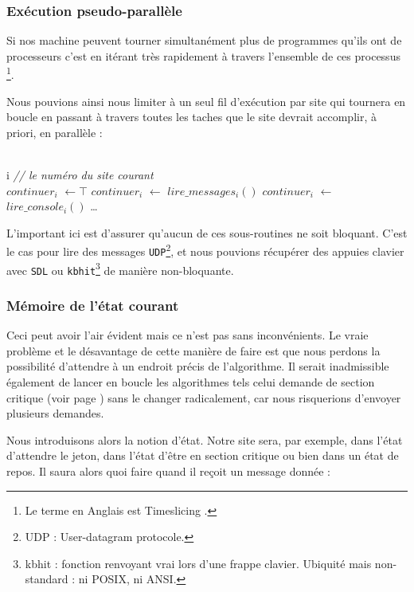 \subsubsection{Exécution pseudo-parallèle}

Si nos machine peuvent tourner \og simultanément \fg{} plus de programmes qu'ils ont de processeurs c'est en itérant très rapidement à travers l'ensemble de ces processus \footnote { Le terme en Anglais est \og Timeslicing \fg{}.}. 

Nous pouvions ainsi nous limiter à un seul fil d'exécution par site qui tournera en boucle en passant à travers toutes les taches que le site devrait accomplir, à priori, en parallèle :

\begin{algorithm}[H]
  \caption{$Boucle_i()$}
  \Donnees
  {\\
    i \textit{// le numéro du site courant}\\
  }
  \Deb
  {
  	$continuer_i$ $\leftarrow \top$ \;
	 {
	 	$continuer_i$ $\leftarrow$ $lire\_messages_i()$ \;
	 	$continuer_i$ $\leftarrow$ $lire\_console_i()$ \;
	 	\dots \;
	 }
  }	
\end{algorithm}

L'important ici est d'assurer qu'aucun de ces sous-routines ne soit bloquant. C'est le cas pour lire des messages \texttt{UDP}\footnote{UDP : User-datagram protocole. }, et nous pouvions récupérer des appuies clavier avec \texttt{SDL} ou \texttt{kbhit}\footnote{kbhit : fonction renvoyant vrai lors d'une frappe clavier. Ubiquité mais non-standard : ni POSIX, ni ANSI.} de manière non-bloquante.

\subsubsection{Mémoire de l'état courant}
Ceci peut avoir l'air évident mais ce n'est pas sans inconvénients. Le vraie problème et le désavantage de cette manière de faire est que nous perdons la possibilité d'attendre à un endroit précis de l'algorithme. Il serait inadmissible également de lancer en boucle les algorithmes tels celui demande de section critique (voir page \pageref{nt_wait}) sans le changer radicalement, car nous risquerions d'envoyer plusieurs demandes. 

Nous introduisons alors la notion d'état. Notre site sera, par exemple, dans l'état d'attendre le jeton, dans l'état d'être en section critique ou bien dans un état de repos. Il saura alors quoi faire quand il reçoit un message donnée :

